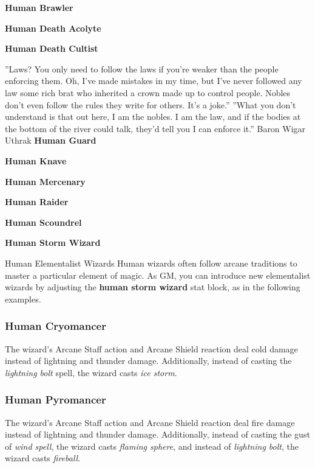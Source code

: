 \documentclass[10pt,a4paper,twoside,bg=print,twocolumn,openany,nodeprecatedcode]{dndbook}
\begin{document}
\textbf{Human Brawler}

\textbf{Human Death Acolyte}

\textbf{Human Death Cultist}

\DndQuote%
{}
{''Laws? You only need to follow the laws if you're weaker than the people enforcing them. Oh, I've made mistakes in my time, but I've never followed any law some rich brat who inherited a crown made up to control people. Nobles don't even follow the rules they write for others. It's a joke.''}
{''What you don't understand is that out here, I am the nobles. I am the law, and if the bodies at the bottom of the river could talk, they'd tell you I can enforce it.''}
{Baron Wigar Uthrak}
\textbf{Human Guard}

\textbf{Human Knave}

\textbf{Human Mercenary}

\textbf{Human Raider}

\textbf{Human Scoundrel}

\textbf{Human Storm Wizard}

\begin{DndSidebar}[float=!b]{Human Elementalist Wizards}
Human wizards often follow arcane traditions to master a particular element of magic. As GM, you can introduce new elementalist wizards by adjusting the \textbf{human storm wizard} stat block, as in the following examples.



\subsubsection{Human Cryomancer}
The wizard's Arcane Staff action and Arcane Shield reaction deal cold damage instead of lightning and thunder damage. Additionally, instead of casting the \textit{lightning bolt} spell, the wizard casts \textit{ice storm}.



\subsubsection{Human Pyromancer}
The wizard's Arcane Staff action and Arcane Shield reaction deal fire damage instead of lightning and thunder damage. Additionally, instead of casting the gust of \textit{wind spell}, the wizard casts \textit{flaming sphere}, and instead of \textit{lightning bolt}, the wizard casts \textit{fireball}.



\end{DndSidebar}
\end{document}
